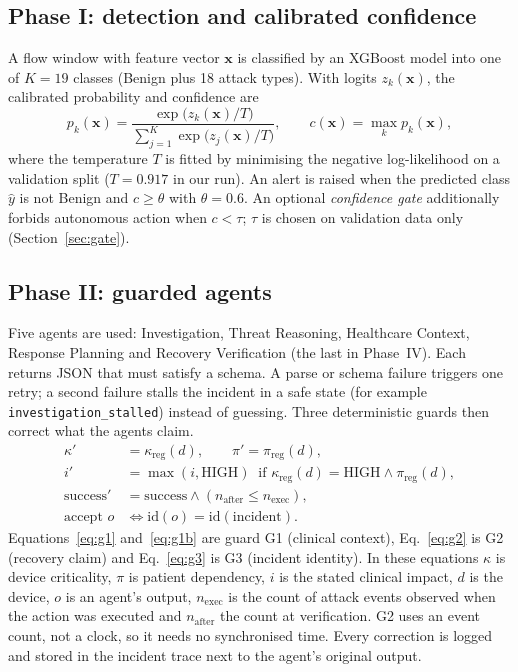 \documentclass[preprint,12pt]{elsarticle}
\begin{document}
\subsection{Phase I: detection and calibrated confidence}
A flow window with feature vector $\mathbf{x}$ is classified by an XGBoost model into one of $K=19$ classes (Benign plus 18 attack types). With logits $z_k(\mathbf{x})$, the calibrated probability and confidence are
\begin{equation}
p_k(\mathbf{x}) = \frac{\exp\!\big(z_k(\mathbf{x})/T\big)}{\sum_{j=1}^{K}\exp\!\big(z_j(\mathbf{x})/T\big)},\qquad c(\mathbf{x}) = \max_k p_k(\mathbf{x}),
\label{eq:temp}
\end{equation}
where the temperature $T$ is fitted by minimising the negative log-likelihood on a validation split ($T=0.917$ in our run). An alert is raised when the predicted class $\hat y$ is not Benign and $c\ge\theta$ with $\theta=0.6$. An optional \emph{confidence gate} additionally forbids autonomous action when $c<\tau$; $\tau$ is chosen on validation data only (Section~\ref{sec:gate}).

\subsection{Phase II: guarded agents}
Five agents are used: Investigation, Threat Reasoning, Healthcare Context, Response Planning and Recovery Verification (the last in Phase~IV). Each returns JSON that must satisfy a schema. A parse or schema failure triggers one retry; a second failure stalls the incident in a safe state (for example \texttt{investigation\_stalled}) instead of guessing. Three deterministic guards then correct what the agents claim.
\begin{align}
\kappa' &= \kappa_{\mathrm{reg}}(d), \qquad \pi' = \pi_{\mathrm{reg}}(d), \label{eq:g1}\\
i' &= \max(i,\mathrm{HIGH}) \ \text{ if } \kappa_{\mathrm{reg}}(d)=\mathrm{HIGH}\wedge \pi_{\mathrm{reg}}(d), \label{eq:g1b}\\
\mathrm{success}' &= \mathrm{success}\wedge (n_{\mathrm{after}}\le n_{\mathrm{exec}}), \label{eq:g2}\\
\text{accept } o &\iff \mathrm{id}(o)=\mathrm{id}(\text{incident}). \label{eq:g3}
\end{align}
Equations~\eqref{eq:g1} and~\eqref{eq:g1b} are guard G1 (clinical context), Eq.~\eqref{eq:g2} is G2 (recovery claim) and Eq.~\eqref{eq:g3} is G3 (incident identity).
In these equations $\kappa$ is device criticality, $\pi$ is patient dependency, $i$ is the stated clinical impact, $d$ is the device, $o$ is an agent's output, $n_{\mathrm{exec}}$ is the count of attack events observed when the action was executed and $n_{\mathrm{after}}$ the count at verification. G2 uses an event count, not a clock, so it needs no synchronised time. Every correction is logged and stored in the incident trace next to the agent's original output.
\end{document}
